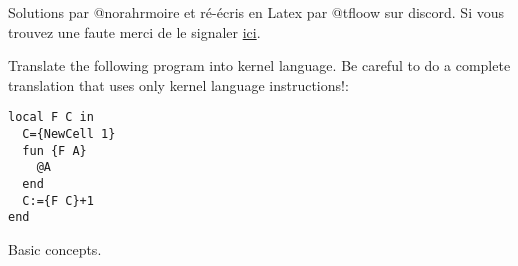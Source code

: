 \documentclass{exam}
\begin{document}
\begin{center}
\end{center}
Solutions par @norahrmoire et ré-écris en Latex par @tfloow sur discord. Si vous trouvez une faute merci de le signaler \href{https://github.com/Tfloow/Q4_EPL/pulls}{ici}.


\begin{questions}

\question Translate the following program into kernel language. Be careful to do a complete translation that uses only kernel language instructions!: \begin{lstlisting}[escapechar=\%]
local F C in
  C={NewCell 1}
  fun {F A}
    @A
  end
  C:={F C}+1
end
\end{lstlisting}

\question Basic concepts.
\end{questions}
\end{document}
